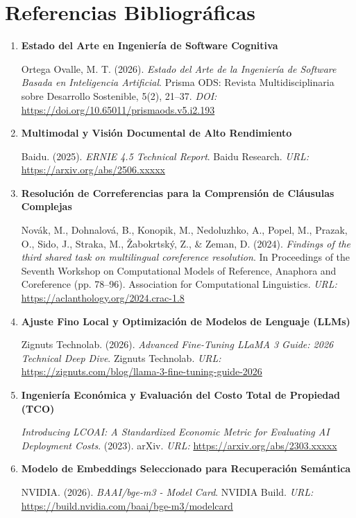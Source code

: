 \documentclass[12pt]{article}
\begin{document}
\section{Referencias Bibliográficas}

\begin{enumerate}
    \item \textbf{Estado del Arte en Ingeniería de Software Cognitiva}

    Ortega Ovalle, M. T. (2026). \textit{Estado del Arte de la Ingeniería de Software Basada en Inteligencia Artificial}. Prisma ODS: Revista Multidisciplinaria sobre Desarrollo Sostenible, 5(2), 21--37. \newline
    \textit{DOI:} \url{https://doi.org/10.65011/prismaods.v5.i2.193}

    \item \textbf{Multimodal y Visión Documental de Alto Rendimiento}

    Baidu. (2025). \textit{ERNIE 4.5 Technical Report}. Baidu Research. \newline
    \textit{URL:} \url{https://arxiv.org/abs/2506.xxxxx}

    \item \textbf{Resolución de Correferencias para la Comprensión de Cláusulas Complejas}

    Novák, M., Dohnalová, B., Konopik, M., Nedoluzhko, A., Popel, M., Prazak, O., Sido, J., Straka, M., Žabokrtský, Z., \& Zeman, D. (2024). \textit{Findings of the third shared task on multilingual coreference resolution}. In Proceedings of the Seventh Workshop on Computational Models of Reference, Anaphora and Coreference (pp. 78--96). Association for Computational Linguistics. \newline
    \textit{URL:} \url{https://aclanthology.org/2024.crac-1.8}

    \item \textbf{Ajuste Fino Local y Optimización de Modelos de Lenguaje (LLMs)}

    Zignuts Technolab. (2026). \textit{Advanced Fine-Tuning LLaMA 3 Guide: 2026 Technical Deep Dive}. Zignuts Technolab. \newline
    \textit{URL:} \url{https://zignuts.com/blog/llama-3-fine-tuning-guide-2026}

    \item \textbf{Ingeniería Económica y Evaluación del Costo Total de Propiedad (TCO)}

    \textit{Introducing LCOAI: A Standardized Economic Metric for Evaluating AI Deployment Costs}. (2023). arXiv. \newline
    \textit{URL:} \url{https://arxiv.org/abs/2303.xxxxx}

    \item \textbf{Modelo de Embeddings Seleccionado para Recuperación Semántica}

    NVIDIA. (2026). \textit{BAAI/bge-m3 - Model Card}. NVIDIA Build. \newline
    \textit{URL:} \url{https://build.nvidia.com/baai/bge-m3/modelcard}
    
\end{enumerate}
\end{document}

